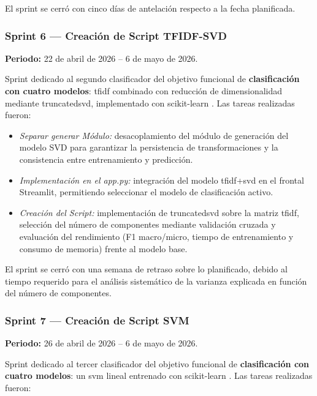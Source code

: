 El sprint se cerró con cinco días de antelación respecto a la fecha planificada.

\subsubsection*{Sprint 6 --- Creación de Script TFIDF-SVD}

\textbf{Periodo:} 22 de abril de 2026 -- 6 de mayo de 2026.

Sprint dedicado al segundo clasificador del objetivo funcional de \textbf{clasificación con cuatro modelos}: \gls{tfidf} combinado con reducción de dimensionalidad mediante \gls{truncatedsvd}, implementado con scikit-learn \cite{scikitlearn_docs}. Las tareas realizadas fueron:

\begin{itemize}
	\item \textit{Separar generar Módulo:} desacoplamiento del módulo de generación del modelo SVD para garantizar la persistencia de transformaciones y la consistencia entre entrenamiento y predicción.
	\item \textit{Implementación en el app.py:} integración del modelo \gls{tfidf}+\gls{svd} en el frontal Streamlit, permitiendo seleccionar el modelo de clasificación activo.
	\item \textit{Creación del Script:} implementación de \gls{truncatedsvd} sobre la matriz \gls{tfidf}, selección del número de componentes mediante validación cruzada y evaluación del rendimiento (F1 macro/micro, tiempo de entrenamiento y consumo de memoria) frente al modelo base.
\end{itemize}

El sprint se cerró con una semana de retraso sobre lo planificado, debido al tiempo requerido para el análisis sistemático de la varianza explicada en función del número de componentes.

\subsubsection*{Sprint 7 --- Creación de Script SVM}

\textbf{Periodo:} 26 de abril de 2026 -- 6 de mayo de 2026.

Sprint dedicado al tercer clasificador del objetivo funcional de \textbf{clasificación con cuatro modelos}: un \gls{svm} lineal entrenado con scikit-learn \cite{scikitlearn_docs}. Las tareas realizadas fueron:


